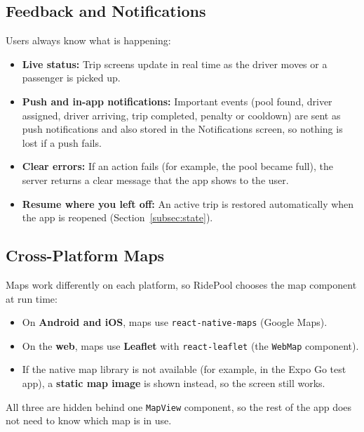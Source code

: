 \subsection{Feedback and Notifications}

Users always know what is happening:

\begin{itemize}
  \item \textbf{Live status:} Trip screens update in real time as the driver
        moves or a passenger is picked up.
  \item \textbf{Push and in-app notifications:} Important events (pool found,
        driver assigned, driver arriving, trip completed, penalty or cooldown)
        are sent as push notifications and also stored in the Notifications
        screen, so nothing is lost if a push fails.
  \item \textbf{Clear errors:} If an action fails (for example, the pool became
        full), the server returns a clear message that the app shows to the
        user.
  \item \textbf{Resume where you left off:} An active trip is restored
        automatically when the app is reopened
        (Section~\ref{subsec:state}).
\end{itemize}

\subsection{Cross-Platform Maps}

Maps work differently on each platform, so RidePool chooses the map component
at run time:

\begin{itemize}
  \item On \textbf{Android and iOS}, maps use \texttt{react-native-maps}
        (Google Maps).
  \item On the \textbf{web}, maps use \textbf{Leaflet} with
        \texttt{react-leaflet} (the \texttt{WebMap} component).
  \item If the native map library is not available (for example, in the Expo
        Go test app), a \textbf{static map image} is shown instead, so the
        screen still works.
\end{itemize}

All three are hidden behind one \texttt{MapView} component, so the rest of the
app does not need to know which map is in use.

